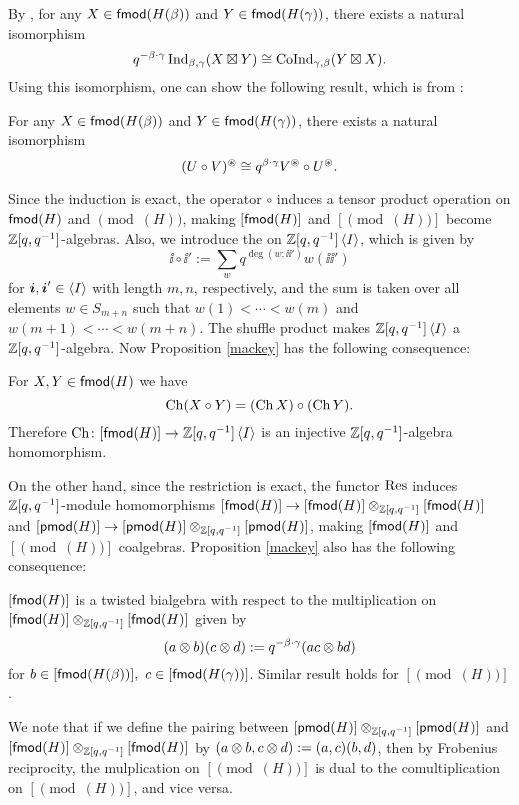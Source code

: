 By \cite[Theorem 2.2]{LV},
for any $X\in\mathsf{fmod}(H(\beta))$ and $Y\in\mathsf{fmod}(H(\gamma))$,
there exists a natural isomorphism 
\[
    q^{-\beta\cdot\gamma}\operatorname{Ind}_{\beta,\gamma}(X\boxtimes Y)
    \cong\operatorname{CoInd}_{\gamma,\beta}(Y\boxtimes X).
\]
Using this isomorphism, one can show the following result, which is from
\cite[Lemma 2.3]{BKM}:
\begin{proposition}\label{dual-of-induction}
    For any $X\in\mathsf{fmod}(H(\beta))$ and $Y\in\mathsf{fmod}(H(\gamma))$,
    there exists a natural isomorphism $$(U\circ V)^\circledast
    \cong q^{\beta\cdot\gamma}V^\circledast\circ U^\circledast.$$
\end{proposition}

Since the induction is exact, the operator $\circ$
induces a tensor product operation on $\mathsf{fmod}(H)$ and $\pmod(H)$,
making $[\mathsf{fmod}(H)]$ and $[\pmod(H)]$ become $\mathbb{Z}[q,q^{-1}]$-algebras.
Also, we introduce the  on $\mathbb{Z}[q,q^{-1}]\left<I\right>$,
which is given by $$\ii\circ\ii' := \sum_{w}q^{\deg(w;\ii\ii')}w(\ii\ii')$$
for $\boldsymbol{i},\boldsymbol{i}'\in\left<I\right>$ with length $m,n$, respectively, and the sum is taken
over all elements $w\in S_{m+n}$ such that $w(1)<\cdots<w(m)$
and $w(m+1)<\cdots<w(m+n)$. The shuffle product makes $\mathbb{Z}[q,q^{-1}]\left<I\right>$
a $\mathbb{Z}[q,q^{-1}]$-algebra. Now Proposition \ref{mackey} has the following consequence:

\begin{proposition}
    For $X,Y\in\mathsf{fmod}(H)$ we have $$\operatorname{Ch}(X\circ Y) = (\operatorname{Ch} X)\circ(\operatorname{Ch} Y).$$
    Therefore $\operatorname{Ch}\colon[\mathsf{fmod}(H)]\to\mathbb{Z}[q,q^{-1}]\left<I\right>$ is an injective
    $\mathbb{Z}[q,q^{-1}]$-algebra homomorphism.
\end{proposition}

On the other hand, since the restriction is exact, the functor $\operatorname{Res}$ induces $\mathbb{Z}[q,q^{-1}]$-module 
homomorphisms $[\mathsf{fmod}(H)]\to[\mathsf{fmod}(H)]\otimes_{\mathbb{Z}[q,q^{-1}]}[\mathsf{fmod}(H)]$
and $[\mathsf{pmod}(H)]\to[\mathsf{pmod}(H)]\otimes_{\mathbb{Z}[q,q^{-1}]}[\mathsf{pmod}(H)]$,
making $[\mathsf{fmod}(H)]$ and $[\pmod(H)]$ coalgebras.
Proposition \ref{mackey} also has the following consequence:

\begin{proposition}
    $[\mathsf{fmod}(H)]$ is a twisted bialgebra with respect to the 
    multiplication on $[\mathsf{fmod}(H)]\otimes_{\mathbb{Z}[q,q^{-1}]}[\mathsf{fmod}(H)]$
    given by $$(a\otimes b)(c\otimes d) := q^{-\beta\cdot\gamma}(ac\otimes bd)$$
    for $b\in[\fmod(H(\beta))],\ c\in[\fmod(H(\gamma))]$.
    Similar result holds for $[\pmod(H)]$.
\end{proposition}

We note that if we define the pairing between 
$[\mathsf{pmod}(H)]\otimes_{\mathbb{Z}[q,q^{-1}]}[\mathsf{pmod}(H)]$ and 
$[\mathsf{fmod}(H)]\otimes_{\mathbb{Z}[q,q^{-1}]}[\mathsf{fmod}(H)]$ by
$(a\otimes b,c\otimes d) := (a,c)(b,d)$, then by Frobenius reciprocity,
the mulplication on $[\pmod(H)]$ is dual to the comultiplication on $[\pmod(H)]$,
and vice versa.

